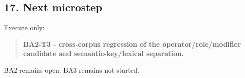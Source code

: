 \documentclass[
  10pt,
  letterpaper,
]{article}
\begin{document}
\subsection{17. Next microstep}\label{next-microstep}

Execute only:

\begin{quote}
\textbf{BA2-T3 - cross-corpus regression of the operator/role/modifier
candidate and semantic-key/lexical separation.}
\end{quote}

BA2 remains open. BA3 remains not started.
\end{document}
